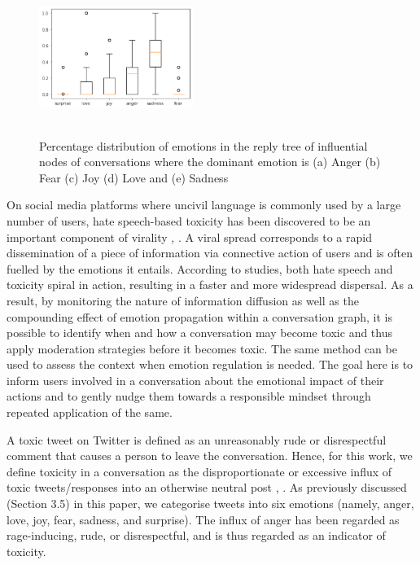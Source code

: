 \documentclass[acmtog]{acmart}
\begin{document}
\begin{figure}[h]
\begin{minipage}{.33\textwidth}
  \end{minipage}%
  \begin{minipage}{.33\textwidth}
    \centering
    \includegraphics[width=5cm,height=5cm,keepaspectratio]{sad_wie.pdf}
  \end{minipage}
  
  \caption{Percentage distribution of emotions in the reply tree of influential nodes of conversations where the dominant emotion is (a) Anger (b) Fear (c) Joy (d) Love and (e) Sadness}
  \label{SampleConv}
  \end{figure}

On social media platforms where uncivil language is commonly used by a large number of users, hate speech-based toxicity has been discovered to be an important component of virality \cite{maarouf2022virality}, \cite{goel2016structural}. A viral spread corresponds to a rapid dissemination of a piece of information via connective action of users and is often fuelled by the emotions it entails. According to studies, both hate speech and toxicity spiral in action, resulting in a faster and more widespread dispersal. As a result, by monitoring the nature of information diffusion as well as the compounding effect of emotion propagation within a conversation graph, it is possible to identify when and how a conversation may become toxic and thus apply moderation strategies before it becomes toxic. The same method can be used to assess the context when emotion regulation is needed. The goal here is to inform users involved in a conversation about the emotional impact of their actions and to gently nudge them towards a responsible mindset through repeated application of the same.

A toxic tweet on Twitter is defined as an unreasonably rude or disrespectful comment that causes a person to leave the conversation. Hence, for this work, we define toxicity in a conversation as the disproportionate or excessive influx of toxic tweets/responses into an otherwise neutral post \cite{aroyo2019crowdsourcing}, \cite{xenos2021toxicity}. As previously discussed (Section 3.5) in this paper, we categorise tweets into six emotions (namely, anger, love, joy, fear, sadness, and surprise). The influx of anger has been regarded as rage-inducing, rude, or disrespectful, and is thus regarded as an indicator of toxicity.
\end{document}
